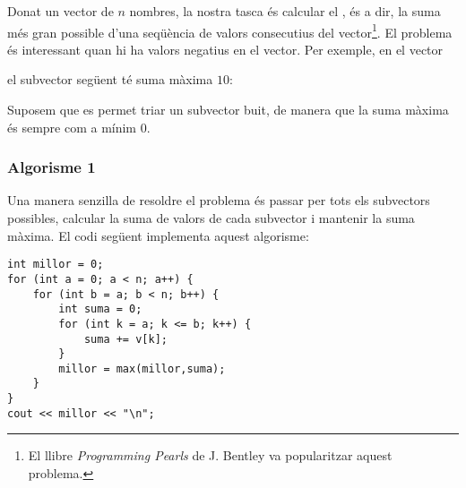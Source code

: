 Donat un vector de $n$ nombres,
la nostra tasca és calcular el
, és a dir,
la suma més gran possible d'una
seqüència de valors consecutius
del vector\footnote{El llibre \emph{Programming Pearls} \cite{ben86} de J. Bentley va popularitzar aquest problema.}.
El problema és interessant quan hi ha valors
negatius en el vector.
Per exemple, en el vector
\begin{centre}
\end{centre}
\begin{samepage}
el subvector següent té suma màxima $10$:
\begin{centre}
\end{centre}
\end{samepage}

Suposem que es permet triar un subvector buit,
de manera que la suma màxima és sempre com a mínim $0$.

\subsubsection{Algorisme 1}

Una manera senzilla de resoldre el problema
és passar per tots els subvectors possibles,
calcular la suma de valors de cada subvector i mantenir
la suma màxima.
El codi següent implementa aquest algorisme:

\begin{lstlisting}
int millor = 0;
for (int a = 0; a < n; a++) {
    for (int b = a; b < n; b++) {
        int suma = 0;
        for (int k = a; k <= b; k++) {
            suma += v[k];
        }
        millor = max(millor,suma);
    }
}
cout << millor << "\n";
\end{lstlisting}

